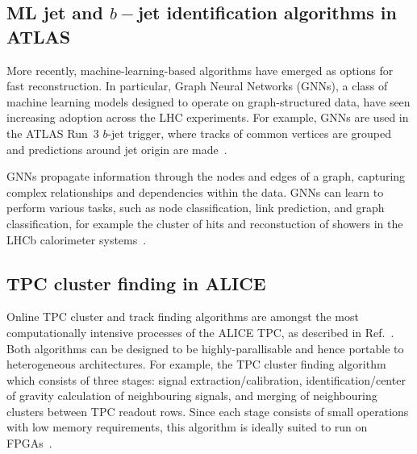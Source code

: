 
\subsection{ML jet and $b-$jet identification algorithms in ATLAS} \label{sec:Algorithms_bTag}

More recently, machine-learning-based algorithms have emerged as options for fast reconstruction. In particular, Graph Neural Networks (GNNs), a class of machine learning models designed to operate on graph-structured data, have seen increasing adoption across the LHC experiments. For example, GNNs are used in the ATLAS Run~3 $b$-jet trigger, where tracks of common vertices are grouped and predictions around jet origin are made~\cite{ATLASTriggerRun3}. 

GNNs propagate information through the nodes and edges of a graph, capturing complex relationships and dependencies within the data. GNNs can learn to perform various tasks, such as node classification, link prediction, and graph classification, for example the cluster of hits and reconstuction of showers in the LHCb calorimeter systems~\cite{canudas2022graph}.

\subsection{TPC cluster finding in ALICE}

Online TPC cluster and track finding algorithms are amongst the most computationally intensive processes of the ALICE TPC, as described in Ref.~\cite{alice-rta-trigger}.
Both algorithms can be designed to be highly-parallisable and hence portable to heterogeneous architectures.
For example, the TPC cluster finding algorithm which consists of three stages: signal extraction/calibration, identification/center of gravity calculation of neighbouring signals, and merging of neighbouring clusters between TPC readout rows.
Since each stage consists of small operations with low memory requirements, this algorithm is ideally suited to run on FPGAs~\cite{alice:fpga}.
